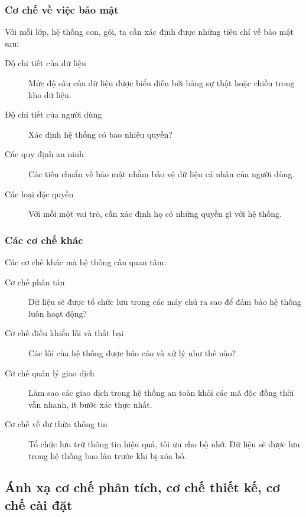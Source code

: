 \documentclass[./../main_file.tex]{subfiles}
\begin{document}
\subsubsection{Cơ chế về việc bảo mật}
Với mỗi lớp, hệ thống con, gói, ta cần xác định được những tiêu chí về bảo mật sau:
\begin{description}
	\item[Độ chi tiết của dữ liệu] Mức độ sâu của dữ liệu được biểu diễn bởi bảng sự thật hoặc chiều trong kho dữ liệu.
	\item[Độ chi tiết của người dùng] Xác định hệ thống có bao nhiêu quyền?
	\item[Các quy định an ninh] Các tiêu chuẩn về bảo mật nhằm bảo vệ dữ liệu cá nhân của người dùng.
	\item[Các loại đặc quyền] Với mỗi một vai trò, cần xác định họ có những quyền gì với hệ thống.
\end{description}

\subsubsection{Các cơ chế khác}
	Các cơ chế khác mà hệ thống cần quan tâm:
\begin{description}
	\item[Cơ chế phân tán] Dữ liệu sẽ được tổ chức lưu trong các máy chủ ra sao để đảm bảo hệ thống luôn hoạt động?
	\item[Cơ chế điều khiển lỗi và thất bại] Các lỗi của hệ thống được báo cáo và xử lý như thế nào?
	\item[Cơ chế quản lý giao dịch] Làm sao các giao dịch trong hệ thống an toàn khỏi các mã độc đồng thời vẫn nhanh, ít bước xác thực nhất. 
	\item[Cơ chế về dư thừa thông tin] Tổ chức lưu trữ thông tin hiệu quả, tối ưu cho bộ nhớ. Dữ liệu sẽ được lưu trong hệ thống bao lâu trước khi bị xóa bỏ.
	
\end{description}


\subsection{Ánh xạ cơ chế phân tích, cơ chế thiết kế, cơ chế cài đặt}
\end{document}
